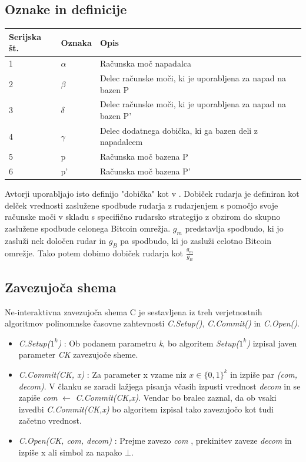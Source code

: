 \documentclass{acm_proc_article-sp}
\begin{document}
\subsection{Oznake in definicije}
\begin{center}
	
	\begin{tabular} {| p{1cm} | p{1cm} | p{4cm}|}
		\hline
		Serijska št. & Oznaka  & Opis \\ \hline
		1 & $\alpha$ & Računska moč napadalca \\  \hline
		2 & $\beta$ & Delec računske moči, ki je uporabljena za napad na bazen  P \\  \hline
		3 & $\delta$ & Delec  računske moči, ki je uporabljena za napad na bazen P' \\  \hline
		4 & $\gamma$ & Delec dodatnega dobička, ki ga bazen deli z napadalcem \\  \hline
		5 & p & Računska moč bazena P  \\ \hline
		6 & p' & Računska moč bazena P'  \\ \hline
	\end{tabular}
\end{center}

\begin{definicija}
	 Avtorji \cite{originalarticle} uporabljajo isto definijo "dobička" kot v \cite{powersplitting}. Dobiček rudarja je definiran kot delček vrednosti zaslužene spodbude rudarja z rudarjenjem s pomočjo svoje računske moči v skladu s specifično rudarsko strategijo z obzirom do skupno zaslužene spodbude celonega Bitcoin omrežja. $g_m$ predstavlja spodbudo, ki jo zasluži nek določen rudar in $g_B$ pa spodbudo, ki jo zasluži celotno Bitcoin omrežje. Tako potem dobimo dobiček rudarja kot $\frac{g_m}{g_B}$
\end{definicija} 

\subsection{Zavezujoča shema}
Ne-interaktivna zavezujoča shema \cite{datamininglectures} C je sestavljena iz treh verjetnostnih algoritmov polinomnske časovne zahtevnosti \textit{C.Setup()}, \textit{C.Commit()} in \textit{C.Open()}.
\begin{itemize}
	\item \textit{C.Setup($1^k$)} : Ob podanem parametru \textit{k}, bo algoritem \textit{Setup($1^k$)} izpisal javen parameter \textit{CK} zavezujoče sheme.
	\item \textit{C.Commit(CK, x)} : Za parameter x vzame niz $x \in \{0,1\}^k$ in izpiše par  \textit{(com, decom)}. V članku \cite{originalarticle} se zaradi lažjega pisanja včasih izpusti vrednost \textit{decom} in se zapiše  \textit{com} $\leftarrow$ \textit{C.Commit(CK,x)}. Vendar bo bralec zaznal, da ob vsaki izvedbi \textit{C.Commit(CK,x)} bo algoritem izpisal tako zavezujočo kot tudi začetno vrednost.
	\item \textit{C.Open(CK, com, decom)} : Prejme zavezo \textit{com} , prekinitev zaveze \textit{decom} in izpiše x ali simbol za napako $\bot$.
\end{itemize}
\end{document}
